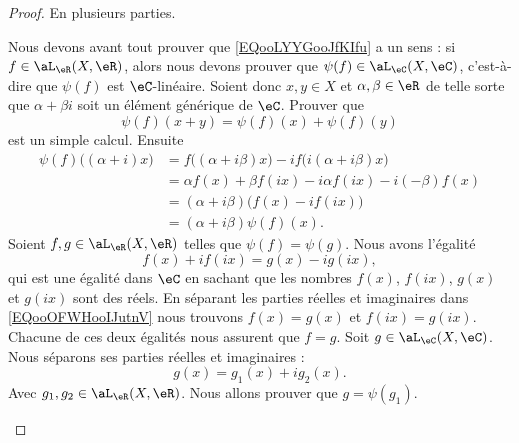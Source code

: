 	\begin{proof}
		En plusieurs parties.
		\begin{subproof}
			Nous devons avant tout prouver que \eqref{EQooLYYGooJfKIfu} a un sens : si \( f\in \aL_{\eR}(X,\eR)\), alors nous devons prouver que \( \psi(f)\in\aL_\eC(X,\eC)\), c'est-à-dire que \( \psi(f)\) est \( \eC\)-linéaire. Soient donc \( x,y\in X\) et \( \alpha,\beta\in \eR\) de telle sorte que \( \alpha+\beta i\) soit un élément générique de \( \eC\). Prouver que
			\begin{equation}
				\psi(f)(x+y)=\psi(f)(x)+\psi(f)(y)
			\end{equation}
			est un simple calcul. Ensuite
			\begin{subequations}
				\begin{align}
					\psi(f)\big( (\alpha+i)x \big) & =f\big( (\alpha+i\beta)x \big)-if\big( i(\alpha+i\beta)x \big) \\
					                               & =\alpha f(x)+\beta f(ix)-i\alpha f(ix)-i(-\beta)f(x)           \\
					                               & =(\alpha+i\beta)\big( f(x)-if(ix) \big)                        \\
					                               & =(\alpha+i\beta)\psi(f)(x).
				\end{align}
			\end{subequations}
			Soient \( f,g\in \aL_{\eR}(X,\eR)\) telles que \( \psi(f)=\psi(g)\). Nous avons l'égalité
			\begin{equation}        \label{EQooOFWHooIJutnV}
				f(x)+if(ix)=g(x)-ig(ix),
			\end{equation}
			qui est une égalité dans \( \eC\) en sachant que les nombres \( f(x)\), \( f(ix)\), \( g(x)\) et \( g(ix)\) sont des réels. En séparant les parties réelles et imaginaires dans \eqref{EQooOFWHooIJutnV} nous trouvons \( f(x)=g(x)\) et \( f(ix)=g(ix)\). Chacune de ces deux égalités nous assurent que \( f=g\).
			Soit \( g\in \aL_{\eC}(X,\eC)\). Nous séparons ses parties réelles et imaginaires :
			\begin{equation}
				g(x)=g_1(x)+ig_2(x).
			\end{equation}
			Avec \( g_1,g_2\in \aL_{\eR}(X,\eR)\). Nous allons prouver que \( g=\psi(g_1)\).


\end{subproof}
\end{proof}
